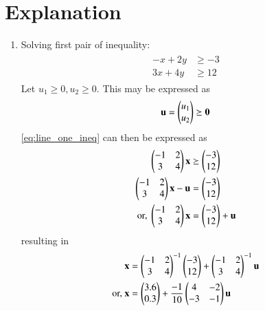 \documentclass[journal,12pt,twocolumn]{IEEEtran}
\begin{document}
\section{Explanation}
\begin{enumerate}
    \item Solving first pair of inequality:
    \begin{align}
\label{eq:line_one_ineq}
\begin{split}
    -x+2y &\geq -3
\\
    3x+4y &\geq 12
\end{split}
\end{align}
\solution  Let $u_1 \ge 0, u_2 \ge 0$.  This may be expressed as
\begin{align}
\mathbf{u} = \begin{pmatrix}u_1\\u_2\end{pmatrix}\succeq \mathbf{0}
\end{align}
%
\eqref{eq:line_one_ineq} can then be expressed as
\begin{align}
\begin{pmatrix}-1 & 2 \\ 3 & 4\end{pmatrix}\mathbf{x}  &\succeq \begin{pmatrix}-3\\12\end{pmatrix}
\\
\begin{pmatrix}-1 & 2 \\ 3 & 4\end{pmatrix}\mathbf{x}  -\mathbf{u}&=\begin{pmatrix}-3\\12\end{pmatrix}
\\
\text{or, }
\begin{pmatrix}-1 & 2 \\ 3 & 4\end{pmatrix}\mathbf{x} &= \begin{pmatrix}-3\\12\end{pmatrix} +\mathbf{u}
\end{align}
%
resulting in 
\begin{align}
\mathbf{x} &= \begin{pmatrix}-1 & 2 \\ 3 & 4\end{pmatrix}^{-1}\begin{pmatrix}-3\\12\end{pmatrix} +\begin{pmatrix}-1 & 2 \\ 3 & 4\end{pmatrix}^{-1}\mathbf{u}
\\
\text{or, } \mathbf{x} &= \begin{pmatrix}3.6\\0.3\end{pmatrix} +\frac{-1}{10}\begin{pmatrix}4 & -2 \\ -3 & -1\end{pmatrix}\mathbf{u}\label{eq:1}
\end{align}
    

\end{enumerate}
\end{document}
